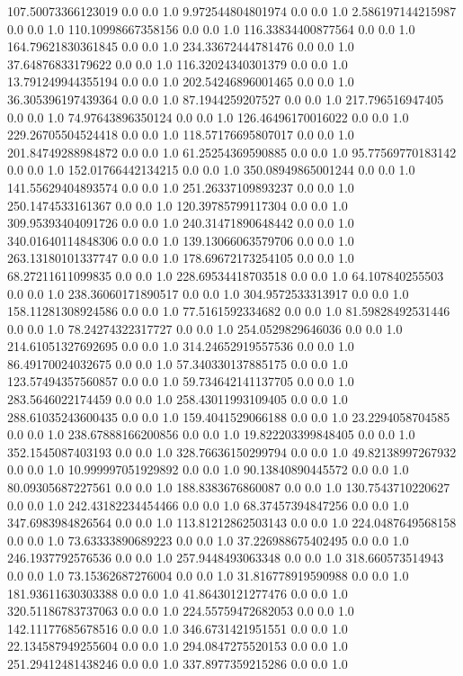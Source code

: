 107.50073366123019	0.0	0.0	1.0
9.972544804801974	0.0	0.0	1.0
2.586197144215987	0.0	0.0	1.0
110.10998667358156	0.0	0.0	1.0
116.33834400877564	0.0	0.0	1.0
164.79621830361845	0.0	0.0	1.0
234.33672444781476	0.0	0.0	1.0
37.64876833179622	0.0	0.0	1.0
116.32024340301379	0.0	0.0	1.0
13.791249944355194	0.0	0.0	1.0
202.54246896001465	0.0	0.0	1.0
36.305396197439364	0.0	0.0	1.0
87.1944259207527	0.0	0.0	1.0
217.796516947405	0.0	0.0	1.0
74.97643896350124	0.0	0.0	1.0
126.46496170016022	0.0	0.0	1.0
229.26705504524418	0.0	0.0	1.0
118.57176695807017	0.0	0.0	1.0
201.84749288984872	0.0	0.0	1.0
61.25254369590885	0.0	0.0	1.0
95.77569770183142	0.0	0.0	1.0
152.01766442134215	0.0	0.0	1.0
350.08949865001244	0.0	0.0	1.0
141.55629404893574	0.0	0.0	1.0
251.26337109893237	0.0	0.0	1.0
250.1474533161367	0.0	0.0	1.0
120.39785799117304	0.0	0.0	1.0
309.95393404091726	0.0	0.0	1.0
240.31471890648442	0.0	0.0	1.0
340.01640114848306	0.0	0.0	1.0
139.13066063579706	0.0	0.0	1.0
263.13180101337747	0.0	0.0	1.0
178.69672173254105	0.0	0.0	1.0
68.27211611099835	0.0	0.0	1.0
228.69534418703518	0.0	0.0	1.0
64.107840255503	0.0	0.0	1.0
238.36060171890517	0.0	0.0	1.0
304.9572533313917	0.0	0.0	1.0
158.11281308924586	0.0	0.0	1.0
77.5161592334682	0.0	0.0	1.0
81.59828492531446	0.0	0.0	1.0
78.24274322317727	0.0	0.0	1.0
254.0529829646036	0.0	0.0	1.0
214.61051327692695	0.0	0.0	1.0
314.24652919557536	0.0	0.0	1.0
86.49170024032675	0.0	0.0	1.0
57.340330137885175	0.0	0.0	1.0
123.57494357560857	0.0	0.0	1.0
59.734642141137705	0.0	0.0	1.0
283.5646022174459	0.0	0.0	1.0
258.43011993109405	0.0	0.0	1.0
288.61035243600435	0.0	0.0	1.0
159.4041529066188	0.0	0.0	1.0
23.2294058704585	0.0	0.0	1.0
238.67888166200856	0.0	0.0	1.0
19.822203399848405	0.0	0.0	1.0
352.1545087403193	0.0	0.0	1.0
328.76636150299794	0.0	0.0	1.0
49.82138997267932	0.0	0.0	1.0
10.999997051929892	0.0	0.0	1.0
90.13840890445572	0.0	0.0	1.0
80.09305687227561	0.0	0.0	1.0
188.8383676860087	0.0	0.0	1.0
130.7543710220627	0.0	0.0	1.0
242.43182234454466	0.0	0.0	1.0
68.37457394847256	0.0	0.0	1.0
347.6983984826564	0.0	0.0	1.0
113.81212862503143	0.0	0.0	1.0
224.0487649568158	0.0	0.0	1.0
73.63333890689223	0.0	0.0	1.0
37.226988675402495	0.0	0.0	1.0
246.1937792576536	0.0	0.0	1.0
257.9448493063348	0.0	0.0	1.0
318.660573514943	0.0	0.0	1.0
73.15362687276004	0.0	0.0	1.0
31.816778919590988	0.0	0.0	1.0
181.93611630303388	0.0	0.0	1.0
41.86430121277476	0.0	0.0	1.0
320.51186783737063	0.0	0.0	1.0
224.55759472682053	0.0	0.0	1.0
142.11177685678516	0.0	0.0	1.0
346.6731421951551	0.0	0.0	1.0
22.134587949255604	0.0	0.0	1.0
294.0847275520153	0.0	0.0	1.0
251.29412481438246	0.0	0.0	1.0
337.8977359215286	0.0	0.0	1.0
